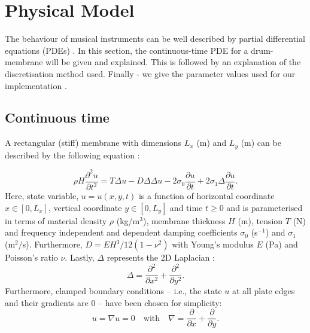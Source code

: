 \documentclass{article}
\begin{document}
\section{Physical Model}\label{sec:PM}
The behaviour of musical instruments can be well described by partial differential equations (PDEs) \cite{Fletcher1998}. In this section, the continuous-time PDE for a drum-membrane will be given and explained. This is followed by an explanation of the discretisation method used. Finally - we give the parameter values used for our implementation . 

\subsection{Continuous time}
A rectangular (stiff) membrane with dimensions $L_x$ (m) and $L_y$ (m) can be described by the following equation \cite{bilbao2009numerical}:

\begin{equation}\label{eq:PDE}
\rho H\frac{\partial^2u}{\partial t^2} = T\Delta u - D\Delta\Delta u - 2 \sigma_0\frac{\partial u}{\partial t} + 2 \sigma_1 \Delta \frac{\partial u}{\partial t}.
\end{equation}
Here, state variable, $u = u(x,y,t)$ is a function of horizontal coordinate $x \in [0, L_x]$, vertical coordinate $y \in [0, L_y]$ and time $t\geq0$ and is parameterised in terms of material density $\rho$ (kg/m$^3$), membrane thickness $H$ (m), tension $T$ (N) and frequency independent and dependent damping coefficients $\sigma_0$ (s$^{-1}$) and $\sigma_1$ (m$^2$/s). Furthermore, $D = EH^3/12(1-\nu^2)$ with Young's modulus $E$ (Pa) and Poisson's ratio $\nu$. Lastly, $\Delta$ represents the 2D Laplacian \cite{bilbao2009numerical}:
\begin{equation}
    \Delta = \frac{\partial^2}{\partial x^2} + \frac{\partial^2}{\partial y^2}.
\end{equation}
Furthermore, clamped boundary conditions -- i.e., the state $u$ at all plate edges and their gradients are 0 -- have been chosen for simplicity:
\begin{equation}
    u = \nabla u = 0 \quad \text{with} \quad \nabla = \frac{\partial}{\partial x} + \frac{\partial}{\partial y}.
\end{equation}
\end{document}
